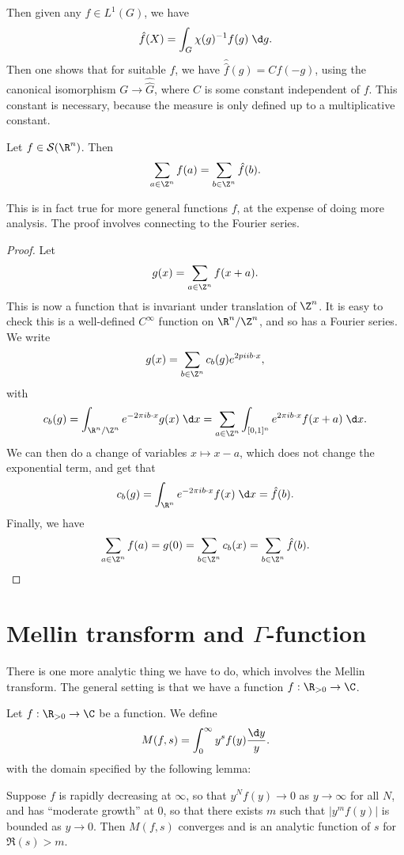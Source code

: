 \documentclass[a4paper]{article}
\begin{document}
Then given any $f \in L^1(G)$, we have
\[
  \hat{f}(X) = \int_G \chi(g)^{-1}f(g) \;\d g.
\]
Then one shows that for suitable $f$, we have $\hat{\hat{f}}(g) = C f(-g)$, using the canonical isomorphism $G \to \hat{\hat{G}}$, where $C$ is some constant independent of $f$. This constant is necessary, because the measure is only defined up to a multiplicative constant.

\begin{thm}
  Let $f \in \mathcal{S}(\R^n)$. Then
  \[
    \sum_{a \in \Z^n} f(a) = \sum_{b \in \Z^n} \hat{f}(b).
  \]
\end{thm}
This is in fact true for more general functions $f$, at the expense of doing more analysis. The proof involves connecting to the Fourier series.

\begin{proof}
  Let
  \[
    g(x) = \sum_{a \in \Z^n} f(x + a).
  \]
  This is now a function that is invariant under translation of $\Z^n$. It is easy to check this is a well-defined $C^\infty$ function on $\R^n/\Z^n$, and so has a Fourier series. We write
  \[
    g(x) = \sum_{b \in \Z^n} c_b(g) e^{2pi i b \cdot x},
  \]
  with
  \[
    c_b(g) = \int_{\R^n/\Z^n} e^{-2\pi i b\cdot x} g(x) \;\d x = \sum_{a \in \Z^n} \int_{[0, 1]^n} e^{2\pi i b\cdot x} f(x + a) \;\d x.
  \]
  We can then do a change of variables $x \mapsto x - a$, which does not change the exponential term, and get that
  \[
    c_b(g) = \int_{\R^n} e^{-2\pi i b \cdot x} f(x) \;\d x = \hat{f}(b).
  \]
  Finally, we have
  \[
    \sum_{a \in \Z^n} f(a) = g(0) = \sum_{b \in \Z^n} c_b(x) = \sum_{b \in \Z^n} \hat{f}(b).
  \]
\end{proof}

\section{Mellin transform and \texorpdfstring{$\Gamma$}{Gamma}-function}
There is one more analytic thing we have to do, which involves the Mellin transform. The general setting is that we have a function $f: \R_{>0} \to \C$.

\begin{defi}
  Let $f: \R_{>0} \to\C$ be a function. We define
  \[
    M(f, s) = \int_0^\infty y^s f(y) \frac{\d y}{y}.
  \]
  with the domain specified by the following lemma:
\end{defi}

\begin{lemma}
  Suppose $f$ is rapidly decreasing at $\infty$, so that $y^N f(y) \to 0$ as $y \to \infty$ for all $N$, and has ``moderate growth'' at $0$, so that there exists $m$ such that $|y^m f(y)|$ is bounded as $y \to 0$. Then $M(f, s)$ converges and is an analytic function of $s$ for $\Re(s) > m$.
\end{lemma}
\end{document}
